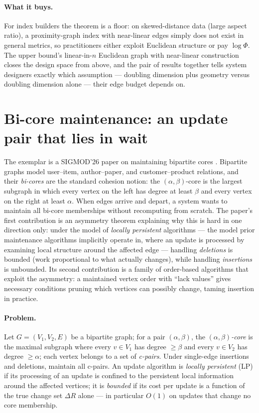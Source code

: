 \paragraph{What it buys.}
For index builders the theorem is a floor: on skewed-distance data (large aspect ratio), a
proximity-graph index with near-linear edges simply does not exist in general metrics, so
practitioners either exploit Euclidean structure or pay $\log\Phi$. The upper bound's linear-in-$n$
Euclidean graph with near-linear construction closes the design space from above, and the pair
of results together tells system designers exactly which assumption --- doubling dimension plus
geometry versus doubling dimension alone --- their edge budget depends on.

\section{Bi-core maintenance: an update pair that lies in wait}
\label{sec:adv-bicore}

The exemplar is a SIGMOD'26 paper on maintaining bipartite cores \citep{sigmod26-179}.
Bipartite graphs model user--item, author--paper, and customer--product relations, and their
\emph{bi-cores} are the standard cohesion notion: the $(\alpha,\beta)$-core is the largest
subgraph in which every vertex on the left has degree at least $\beta$ and every vertex on the
right at least $\alpha$. When edges arrive and depart, a system wants to maintain all bi-core
memberships without recomputing from scratch. The paper's first contribution is an asymmetry
theorem explaining why this is hard in one direction only: under the model of
\emph{locally persistent} algorithms --- the model prior maintenance algorithms implicitly
operate in, where an update is processed by examining local structure around the affected
edge --- handling \emph{deletions} is bounded (work proportional to what actually changes),
while handling \emph{insertions} is unbounded. Its second contribution is a family of
order-based algorithms that exploit the asymmetry: a maintained vertex order with
``lack values'' gives necessary conditions pruning which vertices can possibly change, taming
insertion in practice.

\paragraph{Problem.}
Let $G = (V_1, V_2, E)$ be a bipartite graph; for a pair $(\alpha,\beta)$, the
\emph{$(\alpha,\beta)$-core} is the maximal subgraph where every $v \in V_1$ has degree
$\ge \beta$ and every $v \in V_2$ has degree $\ge \alpha$; each vertex belongs to a set of
\emph{c-pairs}. Under single-edge insertions and deletions, maintain all c-pairs. An update
algorithm is \emph{locally persistent} (LP) if its processing of an update is confined to the
persistent local information around the affected vertices; it is \emph{bounded} if its cost per
update is a function of the true change set $\Delta R$ alone --- in particular $O(1)$ on
updates that change no core membership.


